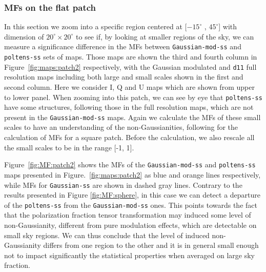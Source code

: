 \documentclass[twocolumn]{aastex631}
\newcommand{\deleven}{{\tt d11}}
\begin{document}
\subsubsection{MFs on the flat patch}
In this section we zoom into a specific region centered at [$-15^{\circ}$ , $45^{\circ} $] with dimension of $20^{\circ}\times20^{\circ}$ to see if, by looking at smaller regions of the sky, we can measure a significance difference in the MFs between \texttt{Gaussian-mod-ss} and \texttt{poltens-ss} sets of maps. Those maps are shown the third and fourth column in Figure~\ref{fig:maps:patch2} respectively, with the Gaussian modulated and \deleven{} full resolution maps including both large and small scales shown in the first and second column. Here we consider I, Q and U maps which are shown from upper to lower panel. When zooming into this patch, we can see by eye that \texttt{poltens-ss} have some structures, following those in the full resolution maps, which are not present in the \texttt{Gaussian-mod-ss} maps. Again we calculate the MFs of these small scales to have an understanding of the non-Gaussianities, following \cite{2008JSMTE..12..015M} for the calculation of MFs for a square patch. Before the calculation, we also rescale all the small scales to be in the range [-1, 1].

Figure~\ref{fig:MF:patch2} shows the MFs of the \texttt{Gaussian-mod-ss} and \texttt{poltens-ss} maps presented in Figure.~\ref{fig:maps:patch2} as blue and orange lines respectively, while MFs for \texttt{Gaussian-ss} are shown in dashed gray lines. 
Contrary to the results presented in Figure \ref{fig:MF:sphere}, in this case we can detect a departure of the \texttt{poltens-ss} from the \texttt{Gaussian-mod-ss} ones. This points towards the fact that the polarization fraction tensor transformation may induced some level of non-Gaussianity, different from pure modulation effects, which are detectable on small sky regions. We can thus conclude that the level of induced non-Gaussianity differs from one region to the other and it is in general small enough not to impact significantly the statistical properties when averaged on large sky fraction.  
\end{document}
